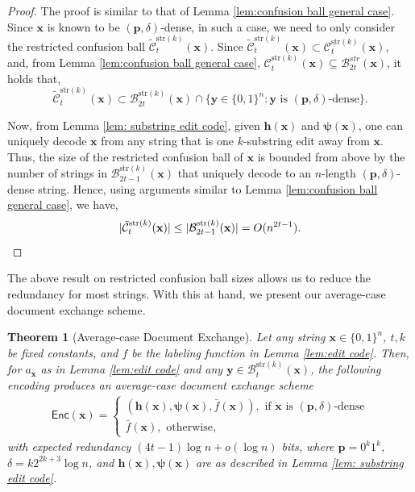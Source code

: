 \documentclass[onecolumn]{IEEEtran}
\newtheorem{theorem}{Theorem}
\newcommand{\bl}{n}
\newcommand{\numedits}{t}
\newcommand{\editsize}{k}
\newcommand{\confball}[3]{\mathcal{C}_{#1}^{#2}(#3)}
\newcommand{\resconfball}[3]{\tilde{\mathcal{C}}_{#1}^{#2}(#3)}
\newcommand{\editball}[3]{\mathcal{B}_{#1}^{#2}(#3)}
\newcommand{\encode}{\mathsf{Enc}}
\newcommand{\bfp}{{\mathbf{ p}}}
\newcommand{\bfx}{{\mathbf{ x}}}
\newcommand{\bfy}{{\mathbf{ y}}}
\begin{document}
\begin{proof}
  The proof is similar to that of Lemma \ref{lem:confusion ball general case}. Since $\mathbf{x}$ is known to be $(\mathbf{p}, \delta)$-dense, in such a case, we need to only consider the restricted confusion ball $\resconfball{\numedits}{\mathrm{str}(\editsize)}{\mathbf{x}}$. Since $\resconfball{\numedits}{\mathrm{str}(\editsize)}{\mathbf{x}} \subset \confball{\numedits}{\mathrm{str}(\editsize)}{\mathbf{x}}$, and, from Lemma \ref{lem:confusion ball general case}, $\confball{\numedits}{\mathrm{str}(\editsize)}{\mathbf{x}} \subseteq \editball{2\numedits}{str}{\mathbf{x}}$, it holds that, $$\resconfball{\numedits}{\mathrm{str}(\editsize)}{\mathbf{x}} \subset  \editball{2\numedits}{\mathrm{str}(\editsize)}{\mathbf{x}}\cap\{\mathbf{y}\in\{0,1\}^\bl : \mathbf{y} \text{ is } (\mathbf{p}, \delta)\text{-dense}\}.$$
  
  Now, from Lemma \ref{lem: substring edit code}, given $\mathbf{h(\mathbf{x})}$ and  $\mathbf{\psi(\mathbf{x})}$, one can uniquely decode $\mathbf{x}$ from any string that is one $\editsize$-substring edit away from $\mathbf{x}$. Thus, the size of the restricted confusion ball of $\mathbf{x}$ is  bounded from above by the number of strings in $\editball{2\numedits-1}{\mathrm{str}(\editsize)}{\mathbf{x}}$ that uniquely decode to an $\bl$-length $(\mathbf{p}, \delta)$-dense string. Hence, using arguments similar to Lemma \ref{lem:confusion ball general case}, we have, \begin{equation*}
      |\resconfball{\numedits}{\mathrm{str}(\editsize)}{\mathbf{x}}| \leq |\editball{2\numedits-1}{\mathrm{str}(\editsize)}{\mathbf{x}}| = O(\bl^{2\numedits-1}).\qedhere
  \end{equation*}
\end{proof}


The above result on restricted confusion ball sizes allows us to reduce the redundancy for most strings. With this at hand, we present our average-case document exchange scheme.
\begin{theorem}[Average-case Document Exchange]
\label{thm: ADx}
    Let any string $\mathbf{x} \in \{0,1\}^\bl$, $\numedits, \editsize$ be fixed constants, and  $f$ be the labeling function in Lemma \ref{lem:edit code}. Then, for $a_\mathbf{x}$ as in Lemma \ref{lem:edit code} and any $\bfy\in\editball{\numedits}{\mathrm{str}(\editsize)}{\mathbf{x}}$, the following encoding produces an average-case document exchange scheme
     \begin{align*}
    \encode(\mathbf{x}) =
    \begin{cases}
        (\mathbf{h(\mathbf{x})}, \mathbf{\psi(\mathbf{x})}, \bar{f}(\mathbf{x})), \text{ if } \bfx \text{ is } (\mathbf{p}, \delta)\text{-dense}\\
        \bar{f}(\mathbf{x}), \text{ otherwise,}
    \end{cases}
    \end{align*} 
    with expected redundancy $(4\numedits-1)\log\bl + o(\log\bl)$ bits, where $\bfp = 0^\editsize1^\editsize$, $\delta = \editsize2^{2\editsize+3}\log\bl$, and $\mathbf{h(\mathbf{x})}, \mathbf{\psi(\mathbf{x})}$ are as described in Lemma \ref{lem: substring edit code}.
\end{theorem}
\end{document}
